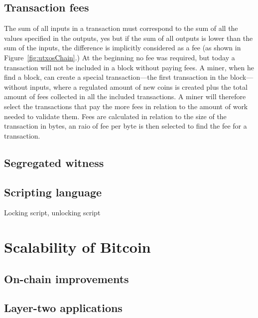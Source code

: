 \subsection{Transaction fees}

The sum of all inputs in a transaction must correspond to the sum of all the values
specified in the outputs, yes but if the sum of all outputs is lower than the sum
of the inputs, the difference is implicitly considered as a fee (as shown in
Figure~\ref{fig:utxosChain}.) At the beginning no fee was required, but today a
transaction will not be included in a block without paying fees. A miner, when he
find a block, can create a special transaction---the first transaction in the
block---without inputs, where a regulated amount of new coins is created plus the
total amount of fees collected in all the included transactions. A miner will therefore
select the transactions that pay the more fees in relation to the amount of work needed
to validate them. Fees are calculated in relation to the size of the transaction
in bytes, an raio of fee per byte is then selected to find the fee for a transaction.

\subsection{Segregated witness}


\subsection{Scripting language}

Locking script, unlocking script

\section{Scalability of Bitcoin}


\subsection{On-chain improvements}
\subsection{Layer-two applications}
